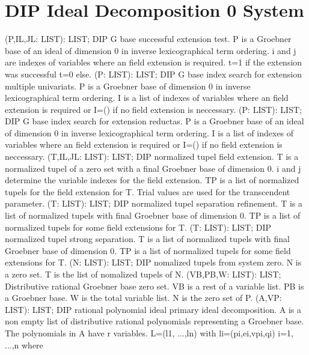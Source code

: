 \section{ DIP Ideal Decomposition 0 System  } 
 (P,IL,JL: LIST): LIST; \eproc
\bcom DIP G base successful extension test. P is a Groebner base of
an ideal of dimension 0 in inverse lexicographical term ordering. 
i and j are indexes of variables where an field extension is required. 
t=1 if the extension was successful t=0 else.  \ecom 
{} (P: LIST): LIST; \eproc
\bcom DIP G base index search for extension multiple univariats.
P is a Groebner base of dimension 0 in inverse lexicographical term 
ordering. I is a list of indexes of variables where an field extension
is required or I=() if no field extension is neccessary.  \ecom 
{} (P: LIST): LIST; \eproc
\bcom DIP G base index search for extension reductas. P is a Groebner
base of an ideal of dimension 0 in inverse lexicographical term 
ordering. I is a list of indexes of variables where an field 
extension is required or I=() if no field extension is neccessary.  \ecom 
{} (T,IL,JL: LIST): LIST; \eproc
\bcom DIP normalized tupel field extension. T is a normalized tupel
of a zero set with a final Groebner base of dimension 0.
i and j determine the variable indexes for the field extension.
TP is a list of normalized tupels for the field extension for T. 
Trial values are used for the transcendent parameter.  \ecom 
{} (T: LIST): LIST; \eproc
\bcom DIP normalized tupel separation refinement. T is a list of
normalized tupels with final Groebner base of dimension 0.
TP is a list of normalized tupels for some field extensions for T.  \ecom 
{} (T: LIST): LIST; \eproc
\bcom DIP normalized tupel strong separation. T is a list of normalized
tupels with final Groebner base of dimension 0. TP is a list of 
normalized tupels for some field extensions for T.  \ecom 
{} (N: LIST): LIST; \eproc
\bcom DIP nomalized tupels from system zero. N is a zero set.
T is the list of nomalized tupels of N.  \ecom 
{} (VB,PB,W: LIST): LIST; \eproc
\bcom Distributive rational Groebner base zero set. VB is a rest of a
variable list. PB is a Groebner base. W is the total variable 
list. N is the zero set of P.  \ecom 
{} (A,VP: LIST): LIST; \eproc
\bcom DIP rational polynomial ideal primary ideal decomposition.
A is a non empty list of distributive rational polynomials 
representing a Groebner base. The polynomials in A have r variables.
L=(l1, ...,ln) with li=(pi,ei,vpi,qi) i=1, ...,n where 
